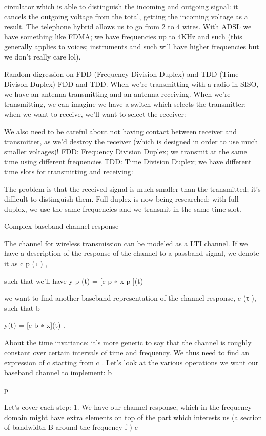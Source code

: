 {circulator which is able to distinguish the incoming and outgoing signal: it cancels the outgoing voltage from the total, getting the incoming voltage as a result.
The telephone hybrid allows us to go from 2 to 4 wires.
With ADSL we have something like FDMA; we have frequencies up to 4KHz and such (this generally applies to voices; instruments and such will have higher frequencies but we don't really care lol).

Random digression on FDD (Frequency Division Duplex)
and TDD (Time Divison Duplex)
FDD and TDD.
When we're transmitting with a radio in SISO, we have an antenna transmitting and an antenna receiving.
When we're transmitting, we can imagine we have a switch which selects the transmitter; when we want to receive, we'll want to select the receiver:

We also need to be careful about not having contact between receiver and transmitter,
as we'd destroy the receiver (which is designed in order to use much smaller voltages)!
FDD: Frequency Division Duplex; we transmit at the same time using different frequencies TDD: Time Division Duplex; we have different time slots for transmitting and receiving:

The problem is that the received signal is much smaller than the transmitted; it's difficult to distinguish them.
Full duplex is now being researched: with full duplex, we use the same frequencies and we transmit in the same time slot.

Complex baseband channel response

The channel for wireless transmission can be modeled as a LTI channel.
If we have a description of the response of the channel to a passband signal, we denote it as c p (τ ) ,

such that we'll have y p (t) = [c p ∗ x p ](t)

we want to find another baseband representation of the channel response, c (τ ), such that b

y(t) = [c b ∗ x](t) .

About the time invariance: it's more generic to say that the channel is roughly constant over certain intervals of time and frequency.
We thus need to find an expression of c starting from c .
Let's look at the various operations we want our baseband channel to implement:
b

p

Let's cover each step:
1. We have our channel response, which in the frequency domain might have extra elements on top of the part which interests us (a section of bandwidth B around the frequency f )
c

}
